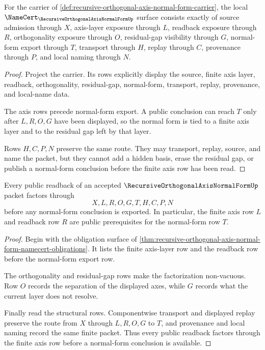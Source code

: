 \begin{theorem}
\label{thm:recursive-orthogonal-axis-normal-form-namecert-obligations}
For the carrier of \autoref{def:recursive-orthogonal-axis-normal-form-carrier}, the local $\NameCert_{\RecursiveOrthogonalAxisNormalFormUp}$ surface consists exactly of source admission through $X$, axis-layer exposure through $L$, readback exposure through $R$, orthogonality exposure through $O$, residual-gap visibility through $G$, normal-form export through $T$, transport through $H$, replay through $C$, provenance through $P$, and local naming through $N$.
\end{theorem}
\begin{proof}
Project the carrier. Its rows explicitly display the source, finite axis layer, readback, orthogonality, residual-gap, normal-form, transport, replay, provenance, and local-name data.

The axis rows precede normal-form export. A public conclusion can reach $T$ only after $L,R,O,G$ have been displayed, so the normal form is tied to a finite axis layer and to the residual gap left by that layer.

Rows $H,C,P,N$ preserve the same route. They may transport, replay, source, and name the packet, but they cannot add a hidden basis, erase the residual gap, or publish a normal-form conclusion before the finite axis row has been read.
\end{proof}

\begin{theorem}
\label{thm:recursive-orthogonal-axis-normal-form-axis-readback}
Every public readback of an accepted $\RecursiveOrthogonalAxisNormalFormUp$ packet factors through
$$
X,L,R,O,G,T,H,C,P,N
$$
before any normal-form conclusion is exported. In particular, the finite axis row $L$ and readback row $R$ are public prerequisites for the normal-form row $T$.
\end{theorem}
\begin{proof}
Begin with the obligation surface of \autoref{thm:recursive-orthogonal-axis-normal-form-namecert-obligations}. It lists the finite axis-layer row and the readback row before the normal-form export row.

The orthogonality and residual-gap rows make the factorization non-vacuous. Row $O$ records the separation of the displayed axes, while $G$ records what the current layer does not resolve.

Finally read the structural rows. Componentwise transport and displayed replay preserve the route from $X$ through $L,R,O,G$ to $T$, and provenance and local naming record the same finite packet. Thus every public readback factors through the finite axis row before a normal-form conclusion is available.
\end{proof}

